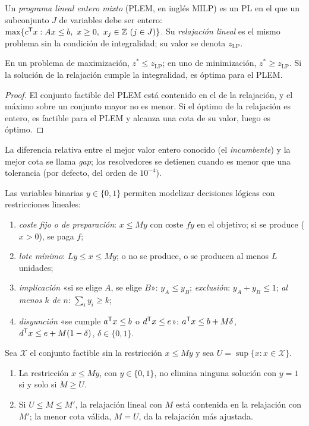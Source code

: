 \begin{definicion}\label{def:plem}
Un \emph{programa lineal entero mixto} (PLEM, en inglés MILP) es un PL en el que un subconjunto $J$ de variables debe ser entero: $\max\{c^{\mathsf{T}} x: Ax\le b,\ x\ge 0,\ x_j\in\mathbb{Z}\ (j\in J)\}$. Su \emph{relajación lineal} es el mismo problema sin la condición de integralidad; su valor se denota $z_{\mathrm{LP}}$.
\end{definicion}

\begin{proposicion}\label{prop:relajacion}
En un problema de maximización, $z^{*}\le z_{\mathrm{LP}}$; en uno de minimización, $z^{*}\ge z_{\mathrm{LP}}$. Si la solución de la relajación cumple la integralidad, es óptima para el PLEM.
\end{proposicion}

\begin{proof}
El conjunto factible del PLEM está contenido en el de la relajación, y el máximo sobre un conjunto mayor no es menor. Si el óptimo de la relajación es entero, es factible para el PLEM y alcanza una cota de su valor, luego es óptimo.
\end{proof}

La diferencia relativa entre el mejor valor entero conocido (el \emph{incumbente}) y la mejor cota se llama \emph{gap}; los resolvedores se detienen cuando es menor que una tolerancia (por defecto, del orden de $10^{-4}$).

Las variables binarias $y\in\{0,1\}$ permiten modelizar decisiones lógicas con restricciones lineales:
\begin{enumerate}[label=(\alph*)]
  \item \emph{coste fijo o de preparación}: $x\le My$ con coste $fy$ en el objetivo; si se produce ($x>0$), se paga $f$;
  \item \emph{lote mínimo}: $Ly\le x\le My$; o no se produce, o se producen al menos $L$ unidades;
  \item \emph{implicación} «si se elige $A$, se elige $B$»: $y_A\le y_B$; \emph{exclusión}: $y_A+y_B\le 1$; \emph{al menos $k$ de $n$}: $\sum_i y_i\ge k$;
  \item \emph{disyunción} «se cumple $a^{\mathsf{T}} x\le b$ o $d^{\mathsf{T}} x\le e$»: $a^{\mathsf{T}} x\le b+M\delta$, $d^{\mathsf{T}} x\le e+M(1-\delta)$, $\delta\in\{0,1\}$.
\end{enumerate}

\begin{proposicion}\label{prop:bigm}
Sea $\mathcal{X}$ el conjunto factible sin la restricción $x\le My$ y sea $U=\sup\{x: x\in\mathcal{X}\}$.
\begin{enumerate}
  \item La restricción $x\le My$, con $y\in\{0,1\}$, no elimina ninguna solución con $y=1$ si y solo si $M\ge U$.
  \item Si $U\le M\le M'$, la relajación lineal con $M$ está contenida en la relajación con $M'$; la menor cota válida, $M=U$, da la relajación más ajustada.
\end{enumerate}
\end{proposicion}

